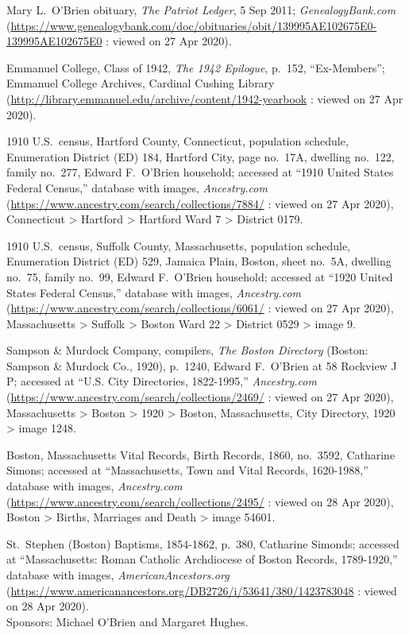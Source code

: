 \begin{thebibliography}{999}
	Mary L.\ O'Brien obituary, \textit{The Patriot Ledger}, 5 Sep 2011; \textit{GenealogyBank.com} (\url{https://www.genealogybank.com/doc/obituaries/obit/139995AE102675E0-139995AE102675E0} : viewed on 27 Apr 2020).
	
	Emmanuel College, Class of 1942, \textit{The 1942 Epilogue}, p.\ 152, ``Ex-Members''; Emmanuel College Archives, Cardinal Cushing Library (\url{http://library.emmanuel.edu/archive/content/1942-yearbook} : viewed on 27 Apr 2020).
	
	1910 U.S.\ census, Hartford County, Connecticut, population schedule, Enumeration District (ED) 184, Hartford City, page no.\ 17A, dwelling no.\ 122, family no.\ 277, Edward F.\ O'Brien household; accessed at ``1910 United States Federal Census,'' database with images, \textit{Ancestry.com} (\url{https://www.ancestry.com/search/collections/7884/} : viewed on 27 Apr 2020), Connecticut > Hartford > Hartford Ward 7 > District 0179.
	
	1910 U.S.\ census, Suffolk County, Massachusetts, population schedule, Enumeration District (ED) 529, Jamaica Plain, Boston, sheet no.\ 5A, dwelling no.\ 75, family no.\ 99, Edward F.\ O'Brien household; accessed at ``1920 United States Federal Census,'' database with images, \textit{Ancestry.com} (\url{https://www.ancestry.com/search/collections/6061/} : viewed on 27 Apr 2020), Massachusetts > Suffolk > Boston Ward 22 > District 0529 > image 9.
	
	Sampson \& Murdock Company, compilers, \textit{The Boston Directory} (Boston: Sampson \& Murdock Co., 1920), p.\ 1240, Edward F.\ O'Brien at 58 Rockview J P; accessed at ``U.S. City Directories, 1822-1995,'' \textit{Ancestry.com} (\url{https://www.ancestry.com/search/collections/2469/} : viewed on 27 Apr 2020), Massachusetts > Boston > 1920 > Boston, Massachusetts, City Directory, 1920 > image 1248.
	
	Boston, Massachusetts Vital Records, Birth Records, 1860, no.\ 3592, Catharine Simons; accessed at ``Massachusetts, Town and Vital Records, 1620-1988,'' database with images, \textit{Ancestry.com} (\url{https://www.ancestry.com/search/collections/2495/} : viewed on 28 Apr 2020), Boston > Births, Marriages and Death > image 54601.
	
	St.\ Stephen (Boston) Baptisms, 1854-1862, p.\ 380, Catharine Simonds; accessed at ``Massachusetts: Roman Catholic Archdiocese of Boston Records, 1789-1920,'' database with images, \textit{AmericanAncestors.org} (\url{https://www.americanancestors.org/DB2726/i/53641/380/1423783048} : viewed on 28 Apr 2020).\\
	Sponsors: Michael O'Brien and Margaret Hughes.
	

\end{thebibliography}
